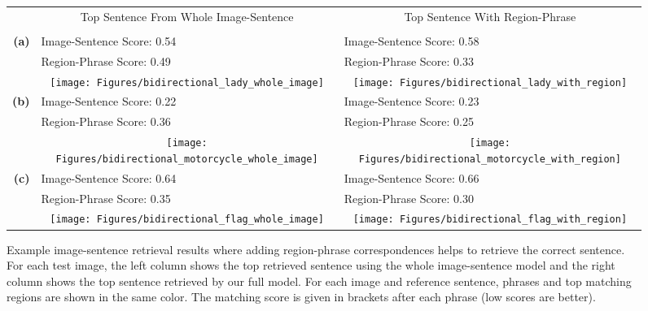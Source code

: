 \documentclass[twocolumn]{svjour3}
\begin{document}
\begin{figure*}
\centering
\begin{tabular}{rc|c}
& \large Top Sentence From Whole Image-Sentence &  \large Top Sentence With Region-Phrase\\
& \large  &  \large \\
\large\bfseries(a) & \multicolumn{1}{l|}{ Image-Sentence Score: 0.54}  & \multicolumn{1}{l}{Image-Sentence Score: 0.58} \\
 &\multicolumn{1}{l|}{Region-Phrase Score: 0.49}  & \multicolumn{1}{l}{Region-Phrase Score: 0.33} \\
&\texttt{[image: Figures/bidirectional\_lady\_whole\_image]} & \texttt{[image: Figures/bidirectional\_lady\_with\_region]} \\
\large\bfseries(b) & \multicolumn{1}{l|}{ Image-Sentence Score: 0.22}  & \multicolumn{1}{l}{Image-Sentence Score: 0.23} \\
 &\multicolumn{1}{l|}{Region-Phrase Score: 0.36}  & \multicolumn{1}{l}{Region-Phrase Score: 0.25} \\
&\texttt{[image: Figures/bidirectional\_motorcycle\_whole\_image]} & \texttt{[image: Figures/bidirectional\_motorcycle\_with\_region]} \\
\large\bfseries(c) & \multicolumn{1}{l|}{ Image-Sentence Score: 0.64}  & \multicolumn{1}{l}{Image-Sentence Score: 0.66} \\
 &\multicolumn{1}{l|}{Region-Phrase Score: 0.35}  & \multicolumn{1}{l}{Region-Phrase Score: 0.30} \\
&\texttt{[image: Figures/bidirectional\_flag\_whole\_image]} & \texttt{[image: Figures/bidirectional\_flag\_with\_region]} \\
\end{tabular}
	\caption{Example image-sentence retrieval results where adding region-phrase correspondences helps to retrieve the correct sentence.  For each test image, the left column shows the top retrieved sentence using the whole image-sentence model and the right column shows the top sentence retrieved by our full model. For each image and reference sentence, phrases and top matching regions are shown in the same color. The matching score is given in brackets after each phrase (low scores are better). }
\label{fig:bidirectionalSuccess}
\end{figure*}
\end{document}
